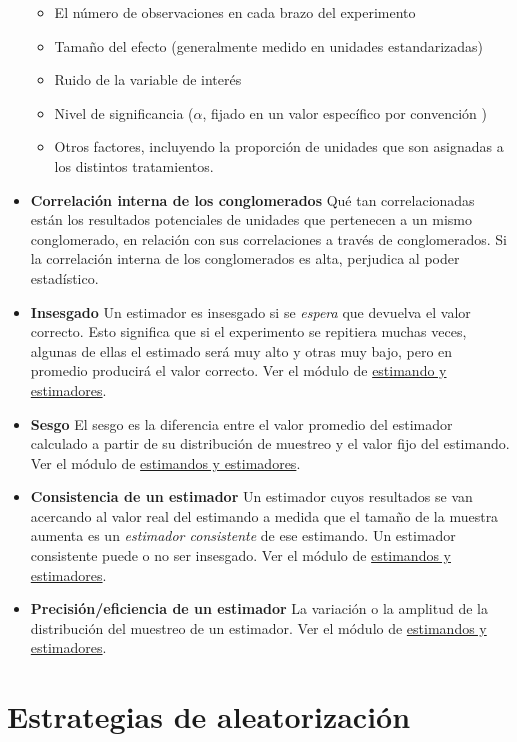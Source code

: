 \documentclass[12pt,spanish,]{book}
\providecommand{\tightlist}{%
  \setlength{\itemsep}{0pt}\setlength{\parskip}{0pt}}
\begin{document}
\begin{itemize}
  \begin{itemize}
  \tightlist
  \item
    El número de observaciones en cada brazo del experimento
  \item
    Tamaño del efecto (generalmente medido en unidades estandarizadas)
  \item
    Ruido de la variable de interés
  \item
    Nivel de significancia (\(\alpha\), fijado en un valor específico por convención )
  \item
    Otros factores, incluyendo la proporción de unidades que son asignadas a los distintos tratamientos.
  \end{itemize}
\item
  \textbf{Correlación interna de los conglomerados} Qué tan correlacionadas están los resultados potenciales de unidades que pertenecen a un mismo conglomerado, en relación con sus correlaciones a través de conglomerados. Si la correlación interna de los conglomerados es alta, perjudica al poder estadístico.
\item
  \textbf{Insesgado} Un estimador es insesgado si se \emph{espera} que devuelva el valor correcto. Esto significa que si el experimento se repitiera muchas veces, algunas de ellas el estimado será muy alto y otras muy bajo, pero en promedio producirá el valor correcto. Ver el módulo de \href{estimandos-y-estimadores.html}{estimando y estimadores}.
\item
  \textbf{Sesgo} El sesgo es la diferencia entre el valor promedio del estimador calculado a partir de su distribución de muestreo y el valor fijo del estimando. Ver el módulo de \href{estimandos-y-estimadores.html}{estimandos y estimadores}.
\item
  \textbf{Consistencia de un estimador} Un estimador cuyos resultados se van acercando al valor real del estimando a medida que el tamaño de la muestra aumenta es un \emph{estimador consistente} de ese estimando. Un estimador consistente puede o no ser insesgado. Ver el módulo de \href{estimandos-y-estimadores.html}{estimandos y estimadores}.
\item
  \textbf{Precisión/eficiencia de un estimador} La variación o la amplitud de la distribución del muestreo de un estimador. Ver el módulo de \href{estimandos-y-estimadores.html}{estimandos y estimadores}.
\end{itemize}

\hypertarget{estrategias-de-aleatorizaciuxf3n}{%
\section{Estrategias de aleatorización}\label{estrategias-de-aleatorizaciuxf3n}}
\end{document}

